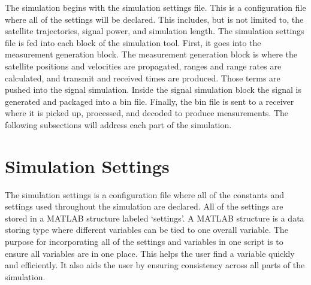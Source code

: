 \documentclass[12pt]{report}
\begin{document}
The simulation begins with the simulation settings file. This is a configuration file where all of the settings will be declared. This includes, but is not limited to, the satellite trajectories, signal power, and simulation length. The simulation settings file is fed into each block of the simulation tool. First, it goes into the measurement generation block. The measurement generation block is where the satellite positions and velocities are propagated, ranges and range rates are calculated, and transmit and received times are produced. Those terms are pushed into the signal simulation. Inside the signal simulation block the signal is generated and packaged into a bin file. Finally, the bin file is sent to a receiver where it is picked up, processed, and decoded to produce measurements. The following subsections will address each part of the simulation.

\section{Simulation Settings}

The simulation settings is a configuration file where all of the constants and settings used throughout the simulation are declared. All of the settings are stored in a MATLAB structure labeled `settings'. A MATLAB structure is a data storing type where different variables can be tied to one overall variable. The purpose for incorporating all of the settings and variables in one script is to ensure all variables are in one place. This helps the user find a variable quickly and efficiently. It also aids the user by ensuring consistency across all parts of the simulation. 
\end{document}
